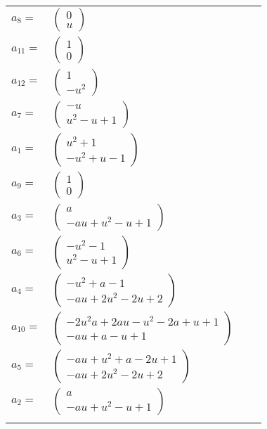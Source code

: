 \documentclass[1p]{elsarticle_modified}
\theoremstyle{definition}
\begin{document}
\begin{tabular}{m{7pt} m{180pt} m{7pt} m{180pt} }
\flushright $a_{8}=$&$\begin{pmatrix}0\\u\end{pmatrix}$ \\
\flushright $a_{11}=$&$\begin{pmatrix}1\\0\end{pmatrix}$ \\
\flushright $a_{12}=$&$\begin{pmatrix}1\\- u^2\end{pmatrix}$ \\
\flushright $a_{7}=$&$\begin{pmatrix}- u\\u^2- u+1\end{pmatrix}$ \\
\flushright $a_{1}=$&$\begin{pmatrix}u^2+1\\- u^2+u-1\end{pmatrix}$ \\
\flushright $a_{9}=$&$\begin{pmatrix}1\\0\end{pmatrix}$ \\
\flushright $a_{3}=$&$\begin{pmatrix}a\\- a u+u^2- u+1\end{pmatrix}$ \\
\flushright $a_{6}=$&$\begin{pmatrix}- u^2-1\\u^2- u+1\end{pmatrix}$ \\
\flushright $a_{4}=$&$\begin{pmatrix}- u^2+a-1\\- a u+2 u^2-2 u+2\end{pmatrix}$ \\
\flushright $a_{10}=$&$\begin{pmatrix}-2 u^2 a+2 a u- u^2-2 a+u+1\\- a u+a- u+1\end{pmatrix}$ \\
\flushright $a_{5}=$&$\begin{pmatrix}- a u+u^2+a-2 u+1\\- a u+2 u^2-2 u+2\end{pmatrix}$ \\
\flushright $a_{2}=$&$\begin{pmatrix}a\\- a u+u^2- u+1\end{pmatrix}$\\&\end{tabular}
\end{document}
